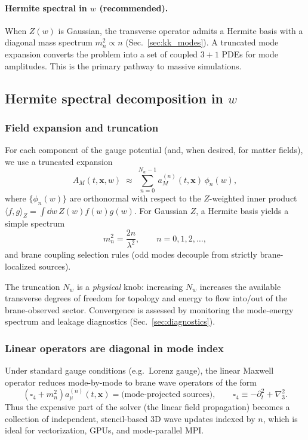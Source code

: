 \documentclass[11pt]{article}
\newcommand{\x}{\mathbf{x}}     %
\newcommand{\lapthree}{\nabla_3^2}
\newcommand{\A}{A}              %
\newcommand{\Z}{Z}              %
\newcommand{\phin}{\phi_n}
\begin{document}
\paragraph{Hermite spectral in \(w\) (recommended).}
When \(\Z(w)\) is Gaussian, the transverse operator admits a Hermite basis with a
diagonal mass spectrum \(m_n^2\propto n\) (Sec.~\ref{sec:kk_modes}). A truncated
mode expansion converts the problem into a set of coupled \(3+1\) PDEs for mode
amplitudes. This is the primary pathway to massive simulations.

\subsection{Hermite spectral decomposition in \texorpdfstring{$w$}{w}}
\label{sec:hermite_scheme}

\subsubsection*{Field expansion and truncation}

For each component of the gauge potential (and, when desired, for matter fields),
we use a truncated expansion
\begin{equation}
\A_M(t,\x,w) \;\approx\; \sum_{n=0}^{N_w-1} a_M^{(n)}(t,\x)\,\phin(w),
\label{eq:Aw_mode_expand}
\end{equation}
where \(\{\phin(w)\}\) are orthonormal with respect to the \(\Z\)-weighted inner
product \(\langle f,g\rangle_{\Z}=\int \dd w\,\Z(w)f(w)g(w)\). For Gaussian \(\Z\),
a Hermite basis yields a simple spectrum
\begin{equation}
m_n^2 = \frac{2n}{\lambda^2},
\qquad n=0,1,2,\ldots,
\label{eq:mn_spectrum_repeat}
\end{equation}
and brane coupling selection rules (odd modes decouple from strictly brane-localized
sources).

The truncation \(N_w\) is a \emph{physical} knob: increasing \(N_w\) increases the
available transverse degrees of freedom for topology and energy to flow into/out
of the brane-observed sector. Convergence is assessed by monitoring the mode-energy
spectrum and leakage diagnostics (Sec.~\ref{sec:diagnostics}).

\subsubsection*{Linear operators are diagonal in mode index}

Under standard gauge conditions (e.g.\ Lorenz gauge), the linear Maxwell operator
reduces mode-by-mode to brane wave operators of the form
\begin{equation}
\left(\square_4 + m_n^2\right)a_\mu^{(n)}(t,\x)
= \text{(mode-projected sources)},
\qquad
\square_4\equiv -\partial_t^2+\lapthree.
\label{eq:mode_linear_operator}
\end{equation}
Thus the expensive part of the solver (the linear field propagation) becomes a
collection of independent, stencil-based \(3\)D wave updates indexed by \(n\),
which is ideal for vectorization, GPUs, and mode-parallel MPI.
\end{document}
